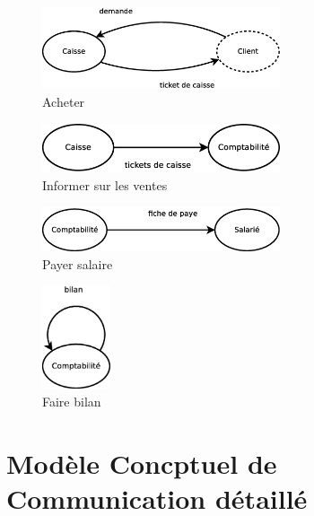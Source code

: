 \begin{figure}[!htb]
    \begin{center}
    \includegraphics[width=7cm]{images/mcc_acheter.eps}
    \caption{\label{mcc_acheter} Acheter}
    \end{center}
\end{figure}

\begin{figure}[!htb]
    \begin{center}
    \includegraphics[width=7cm]{images/mcc_isv.eps}
    \caption{\label{mcc_isv} Informer sur les ventes}
    \end{center}
\end{figure}

\begin{figure}[!htb]
    \begin{center}
    \includegraphics[width=7cm]{images/mcc_ps.eps}
    \caption{\label{mcc_ps} Payer salaire}
    \end{center}
\end{figure}

\begin{figure}[!htb]
    \begin{center}
    \includegraphics[width=2cm]{images/mcc_bilan.eps}
    \caption{\label{mcc_ps} Faire bilan}
    \end{center}
\end{figure}


\section*{Modèle Concptuel de Communication détaillé}

